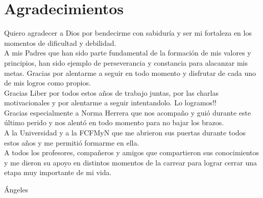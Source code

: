 
\chapter*{Agradecimientos}
 
Quiero agradecer a Dios por bendecirme con sabidur\'ia y ser mi fortaleza en los momentos de dificultad y debilidad. \\

A mis Padres que han sido parte fundamental de la formaci\'on de mis valores y principios, han sido ejemplo de perseverancia y constancia para alacanzar mis metas. Gracias por alentarme a seguir en todo momento y disfrutar de cada uno de mis logros como propios.\\

Gracias Liber por todos estos a\~nos de trabajo juntas, por las charlas motivacionales y por alentarme a seguir intentandolo. Lo logramos!!\\

Gracias especialmente a Norma Herrera que nos acompa\~no y gui\'o durante este \'ultimo perido y nos alent\'o en todo momento para no bajar los brazos.\\

A la Universidad y a la FCFMyN que me abrieron sus puertas durante todos estos a\~nos y me permiti\'o formarme en ella. \\

A todos los profesores, compa\~neros y amigos que compartieron sus conocimientos y me dieron su apoyo en distintos momentos de la carrear para lograr cerrar una etapa muy importante de mi vida.\\

\begin{flushright}
\'Angeles
\end{flushright}
